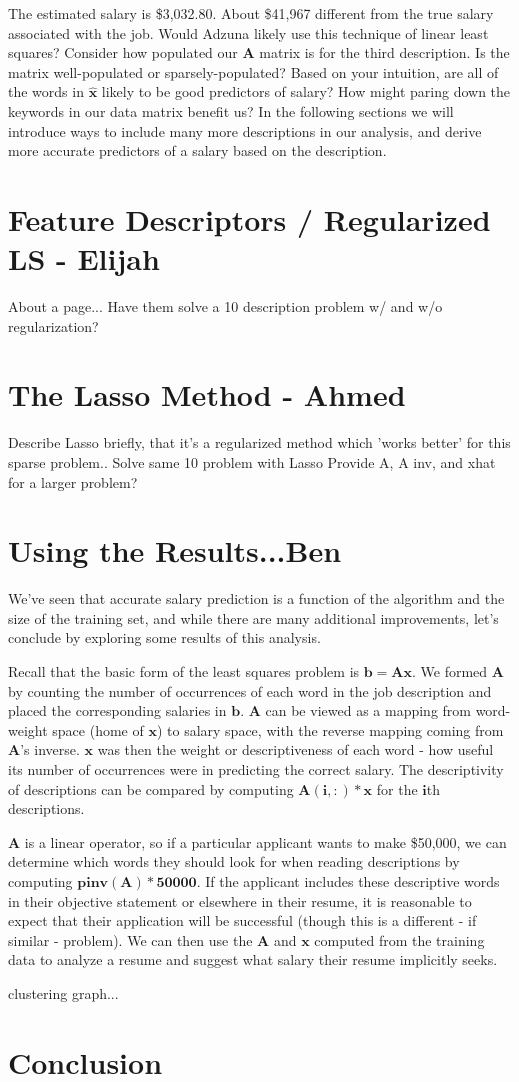 \documentclass[12pt]{article}
\begin{document}
    The estimated salary is \$3,032.80. About \$41,967 different from the true
    salary associated with the job. Would Adzuna likely use this technique of
    linear least squares? Consider how populated our $\bm{A}$ matrix is for the
    third description. Is the matrix well-populated or sparsely-populated?
    Based on your intuition, are all of the words in $\bm{\hat{x}}$ likely to
    be good predictors of salary? How might paring down the keywords in our
    data matrix benefit us? In the following sections we will introduce ways to
    include many more descriptions in our analysis, and derive more accurate
    predictors of a salary based on the description.

\section{Feature Descriptors / Regularized LS - Elijah}
About a page...
Have them solve a 10 description problem w/ and w/o regularization?

\section{The Lasso Method - Ahmed}
Describe Lasso briefly, that it's a regularized method which 'works better' for this sparse problem..
Solve same 10 problem with Lasso
Provide A, A inv, and xhat for a larger problem?

\section{Using the Results...Ben}
We've seen that accurate salary prediction is a function of the algorithm and the size of the training set, and while there are many additional improvements, let's conclude by exploring some results of this analysis.

Recall that the basic form of the least squares problem is $\bm{b = Ax}$.
We formed $\bm{A}$ by counting the number of occurrences of each word in the job description and placed the corresponding salaries in $\bm{b}$.
$\bm{A}$ can be viewed as a mapping from word-weight space (home of $\bm{x}$) to salary space, with the reverse mapping coming from $\bm{A}$'s inverse.
$\bm{x}$ was then the weight or descriptiveness of each word - how useful its number of occurrences were in predicting the correct salary.
The descriptivity of descriptions can be compared by computing $\bm{A(i,:)*x}$ for the $\bm{i}$th descriptions.

$\bm{A}$ is a linear operator, so if a particular applicant wants to make \$50,000, we can determine which words they should look for when reading descriptions by computing $\bm{pinv(A)*50000}$.
If the applicant includes these descriptive words in their objective statement or elsewhere in their resume, it is reasonable to expect that their application will be successful (though this is a different - if similar - problem).
We can then use the $\bm{A}$ and $\bm{x}$ computed from the training data to analyze a resume and suggest what salary their resume implicitly seeks.

clustering graph...



\section{Conclusion}
\end{document}
